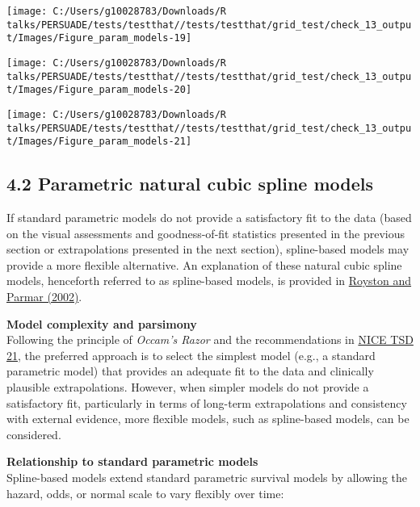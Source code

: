 \documentclass[
]{article}
\begin{document}
\begin{flushleft}\texttt{[image: C:/Users/g10028783/Downloads/R talks/PERSUADE/tests/testthat//tests/testthat/grid\_test/check\_13\_output/Images/Figure\_param\_models-19]} \end{flushleft}

\begin{flushleft}\texttt{[image: C:/Users/g10028783/Downloads/R talks/PERSUADE/tests/testthat//tests/testthat/grid\_test/check\_13\_output/Images/Figure\_param\_models-20]} \end{flushleft}

\begin{flushleft}\texttt{[image: C:/Users/g10028783/Downloads/R talks/PERSUADE/tests/testthat//tests/testthat/grid\_test/check\_13\_output/Images/Figure\_param\_models-21]} \end{flushleft}

\clearpage

\subsection{4.2 Parametric natural cubic spline
models}\label{parametric-natural-cubic-spline-models}

If standard parametric models do not provide a satisfactory fit to the
data (based on the visual assessments and goodness-of-fit statistics
presented in the previous section or extrapolations presented in the
next section), spline-based models may provide a more flexible
alternative. An explanation of these natural cubic spline models,
henceforth referred to as spline-based models, is provided in
\href{https://doi.org/10.1002/sim.1203}{Royston and Parmar (2002)}.

\textbf{Model complexity and parsimony}\\
Following the principle of \emph{Occam's Razor} and the recommendations
in
\href{https://www.sheffield.ac.uk/media/34188/download?attachment}{NICE
TSD 21}, the preferred approach is to select the simplest model (e.g., a
standard parametric model) that provides an adequate fit to the data and
clinically plausible extrapolations. However, when simpler models do not
provide a satisfactory fit, particularly in terms of long-term
extrapolations and consistency with external evidence, more flexible
models, such as spline-based models, can be considered.

\textbf{Relationship to standard parametric models}\\
Spline-based models extend standard parametric survival models by
allowing the hazard, odds, or normal scale to vary flexibly over time:
\end{document}
